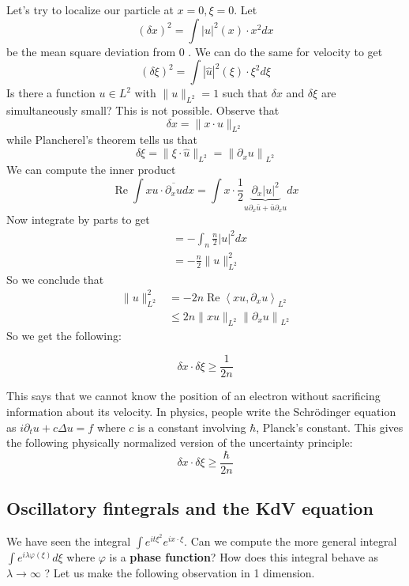 Let's try to localize our particle at $x=0, \xi=0$. Let
$$
(\delta x)^{2}=\int|u|^{2}(x) \cdot x^{2} d x
$$
be the mean square deviation from 0 . We can do the same for velocity to get
$$
(\delta \xi)^{2}=\int|\widehat{u}|^{2}(\xi) \cdot \xi^{2} d \xi
$$
Is there a function $u \in L^{2}$ with $\|u\|_{L^{2}}=1$ such that $\delta x$ and $\delta \xi$ are simultaneously small? This is not possible. Observe that
$$
\delta x=\|x \cdot u\|_{L^{2}}
$$
while Plancherel's theorem tells us that
$$
\delta \xi=\|\xi \cdot \widehat{u}\|_{L^{2}}=\left\|\partial_{x} u\right\|_{L^{2}}
$$
We can compute the inner product
$$
\operatorname{Re} \int x u \cdot \overline{\partial_{x} u} d x=\int x \cdot \frac{1}{2} \underbrace{\partial_{x}|u|^{2}}_{u \partial_{x} \bar{u}+\bar{u} \partial_{x} u} d x
$$
Now integrate by parts to get
$$
\begin{aligned}
&=-\int_{n} \frac{n}{2}|u|^{2} d x \\
&=-\frac{n}{2}\|u\|_{L^{2}}^{2}
\end{aligned}
$$
So we conclude that
$$
\begin{aligned}
\|u\|_{L^{2}}^{2} &=-2 n \operatorname{Re}\left\langle x u, \partial_{x} u\right\rangle_{L^{2}} \\
& \leq 2 n\|x u\|_{L^{2}}\left\|\partial_{x} u\right\|_{L^{2}}
\end{aligned}
$$
So we get the following:

\begin{theorem}
\[
    \delta x \cdot \delta \xi \geq \frac{1}{2 n}
\]
\end{theorem}

\begin{remark}
    This says that we cannot know the position of an electron without sacrificing information about its velocity. In physics, people write the Schrödinger equation as $i \partial_{t}u+c \Delta u=f$ where $c$ is a constant involving $\hbar$, Planck's constant. This gives the following physically normalized version of the uncertainty principle:
    $$
    \delta x \cdot \delta \xi \geq \frac{\hbar}{2 n}
    $$
        
\end{remark}

\subsection{Oscillatory fintegrals and the KdV equation}

We have seen the integral $\int e^{i t \xi^{2}} e^{i x \cdot \xi}$. Can we compute the more general integral $\int e^{i \lambda \varphi(\xi)} d \xi$ where $\varphi$ is a \textbf{phase function}? How does this integral behave as $\lambda \rightarrow \infty$ ? Let us make the following observation in 1 dimension.

